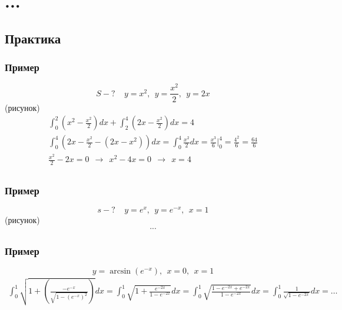 \documentclass{article}
\begin{document}
\section{...}
\subsection{Практика}
\subsubsection{Пример}
\[
    S - ? ~~~~~ y = x^2, ~~y = \frac{x^2}{2}, ~~y = 2x 
\]
(рисунок)
\begin{gather*}
    \int_{0}^{2} \left(x^2 - \frac{x^2}{2}\right) dx + \int_{2}^{4} \left(2x - \frac{x^2}{2}\right) dx = 4 \\
    \int_{0}^{4} \left(2x - \frac{x^2}{2} - \left(2x - x^2\right)\right) dx =
    \int_{0}^{4} \frac{x^2}{2} dx = \frac{x^3}{6} \Bigg|_{0}^{4} = \frac{4^2}{6} = \frac{64}{6} \\
    \frac{x^2}{2} - 2x = 0 ~~\rightarrow~~ x^2 - 4x = 0 ~~\rightarrow~~ x = 4 \\
\end{gather*}

\subsubsection{Пример}
\[
    s - ? ~~~~~ y = e^x, ~~y = e^{-x}, ~~x = 1
\]
(рисунок)
\begin{gather*}
    ...
\end{gather*}

\subsubsection{Пример}
\[
    y = \arcsin \left(e^{-x}\right), ~~x = 0, ~~x = 1
\]
\begin{gather*}
    \int_{0}^{1} \sqrt{1 + \left(\frac{-e^{-x}}{\sqrt{1 - (e^{-x})^2}}\right)} dx = 
    \int_{0}^{1} \sqrt{1 + \frac{e^{-2x}}{1 - e^{-2x}}} dx =
    \int_{0}^{1} \sqrt{\frac{1 - e^{-2x} + e^{-2x}}{1 - e^{-2x}}} dx =
    \int_{0}^{1} \frac{1}{\sqrt{1 - e^{-2x}}} dx = \dots
\end{gather*}
\end{document}
